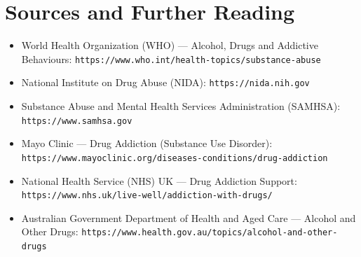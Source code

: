 \section*{Sources and Further Reading}
\begin{itemize}
    \item World Health Organization (WHO) --- Alcohol, Drugs and Addictive Behaviours: \texttt{https://www.who.int/health-topics/substance-abuse}
    \item National Institute on Drug Abuse (NIDA): \texttt{https://nida.nih.gov}
    \item Substance Abuse and Mental Health Services Administration (SAMHSA): \texttt{https://www.samhsa.gov}
    \item Mayo Clinic --- Drug Addiction (Substance Use Disorder): \texttt{https://www.mayoclinic.org/diseases-conditions/drug-addiction}
    \item National Health Service (NHS) UK --- Drug Addiction Support: \texttt{https://www.nhs.uk/live-well/addiction-with-drugs/}
    \item Australian Government Department of Health and Aged Care --- Alcohol and Other Drugs: \texttt{https://www.health.gov.au/topics/alcohol-and-other-drugs}
\end{itemize}